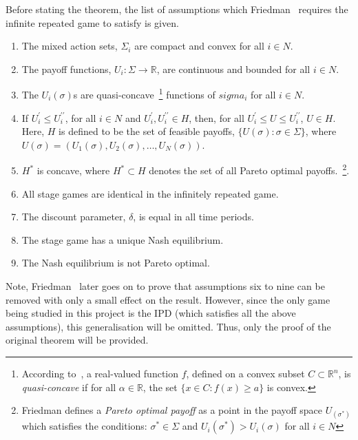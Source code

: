 Before stating the theorem, the list of assumptions which
Friedman~\cite{friedman1971non} requires the infinite repeated game to satisfy is given.
\begin{enumerate}
    \item The mixed action sets, \(\Sigma_{i}\) are compact and convex for all
    \(i\in N\). 
    \item The payoff functions, \(U_{i}: \Sigma \to \mathbb{R}\), are continuous
    and bounded for all \(i\in N\).
    \item The \(U_{i}(\sigma)\)s are quasi-concave~\footnote{According
    to~\cite{Stover}, a real-valued function \(f\), defined on a convex subset
    \(C \subset \mathbb{R}^n\), is \textit{quasi-concave} if for all \(\alpha
    \in \mathbb{R}\), the set \( \{ x \in C : f(x) \ge a \} \) is convex.}
    functions of \(sigma_{i}\) for all \(i\in N\).
    \item If  \(U_{i}^{\prime} \le U_{i}^{\prime\prime}\), for all \(i\in N\)
    and \(U_{i}^{\prime}, U_{i}^{\prime\prime} \in H\), then, for all
    \(U_{i}^{\prime} \le U \le U_{i}^{\prime\prime}\), \(U \in H\). Here, \(H\)
    is defined to be the set of feasible payoffs, \( \{ U(\sigma) : \sigma \in
    \Sigma \} \), where \(U(\sigma) = (U_{1}(\sigma), U_{2}(\sigma), \ldots,
    U_{N}(\sigma))\).
    \item  \(H^{*}\) is concave, where \(H^{*} \subset H\) denotes the set of
    all Pareto optimal payoffs.~\footnote{Friedman defines a \textit{Pareto
    optimal payoff} as a point in the payoff space \(U_(\sigma^{*})\) which
    satisfies the conditions: \(\sigma^{*} \in \Sigma \) and \(U_{i}(\sigma^{*})
    > U_{i}(\sigma)\) for all \(i \in N\)}.
    \item All stage games are identical in the infinitely repeated game.
    \item The discount parameter, \(\delta \), is equal in all time periods.
    \item The stage game has a unique Nash equilibrium.
    \item The Nash equilibrium is not Pareto optimal. 
\end{enumerate}
Note, Friedman~\cite{friedman1971non} later goes on to prove that assumptions
six to nine can be removed with only a small effect on the result. However,
since the only game being studied in this project is the IPD (which satisfies
all the above assumptions), this generalisation will be omitted. Thus, only the
proof of the original theorem will be provided.

